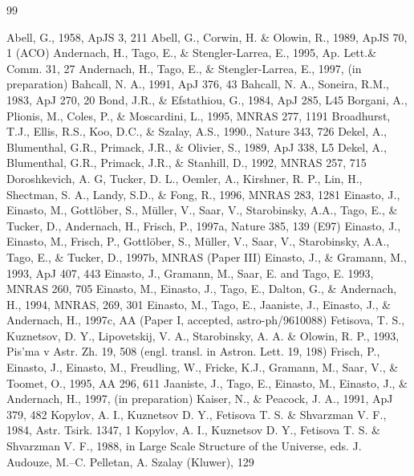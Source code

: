 \begin{thebibliography}{99}

 Abell, G., 1958, ApJS 3, 211
 Abell, G., Corwin, H. \& Olowin, R., 1989, ApJS 70, 1 (ACO)
 Andernach, H., Tago, E., \& Stengler-Larrea, E., 1995, 
Ap. Lett.\& Comm. 31, 27 
 Andernach, H., Tago, E., \& Stengler-Larrea, E., 1997, 
(in preparation)
 Bahcall, N. A., 1991, ApJ 376, 43
 Bahcall, N. A., Soneira, R.M., 1983, ApJ 270, 20
  Bond, J.R., \& Efstathiou, G., 1984, ApJ 285,
L45 
 Borgani, A., Plionis, M., Coles, P., \& Moscardini, L.,
1995, MNRAS 277, 1191
 Broadhurst, T.J., Ellis, R.S., Koo, D.C., \& Szalay,
A.S., 1990., Nature 343, 726
 Dekel, A., Blumenthal, G.R., Primack, J.R., \& Olivier,
S., 1989, ApJ 338, L5
 Dekel, A., Blumenthal, G.R., Primack, J.R., \& Stanhill, D.,
1992, MNRAS 257, 715
 Doroshkevich, A. G, Tucker, D. L., Oemler, A., Kirshner,
R. P., Lin, H., Shectman, S. A., Landy, S.D., \& Fong, R., 1996, MNRAS
283, 1281
 Einasto, J., Einasto, M., Gottl\"ober, S., M\"uller, V., Saar,
V., Starobinsky, A.A., Tago, E., \& Tucker, D., Andernach, H., 
Frisch, P., 1997a, Nature 385, 139 (E97)
 Einasto, J., Einasto, M., Frisch, P., Gottl\"ober, S.,
M\"uller, V., Saar, V., Starobinsky, A.A., Tago, E., \& Tucker, D., 1997b,
MNRAS (Paper III)
 Einasto, J., \& Gramann, M., 1993, ApJ 407, 443
 Einasto, J., Gramann, M., Saar, E. and Tago, E. 1993,
MNRAS 260, 705
 Einasto, M., Einasto, J., Tago, E., Dalton, G., \&
Andernach, H., 1994, MNRAS, 269, 301
 Einasto, M., Tago, E., Jaaniste, J., Einasto, J., \&
Andernach, H.,  1997c, AA (Paper I, accepted, astro-ph/9610088)
 Fetisova, T. S., Kuznetsov, D. Y., Lipovetskij, V. A.,
Starobinsky, A. A. \& Olowin, R. P., 1993, Pis'ma v Astr. Zh. 19,
508 (engl. transl. in Astron. Lett. 19, 198)
 Frisch, P., Einasto, J., Einasto, M., Freudling, W.,
Fricke, K.J., Gramann, M., Saar, V., \& Toomet, O., 1995, AA 296, 611
 Jaaniste, J., Tago, E., Einasto, M., Einasto, J., \&
Andernach, H., 1997, (in preparation) 
 Kaiser, N., \& Peacock, J. A., 1991, ApJ 379, 482
 Kopylov, A. I., Kuznetsov D. Y., Fetisova T. S. \&
Shvarzman V. F., 1984, Astr. Tsirk. 1347, 1
 Kopylov, A. I., Kuznetsov D. Y., Fetisova T. S. \&
Shvarzman V. F., 1988, in Large Scale Structure of the Universe,
eds. J. Audouze, M.--C. Pelletan, A. Szalay (Kluwer), 129

\end{thebibliography}
